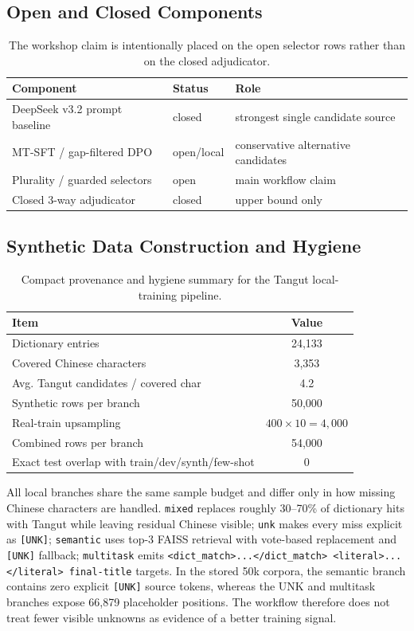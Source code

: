 \documentclass{article}
\begin{document}
\subsection{Open and Closed Components}

\begin{table}[H]
\centering
\small
\begin{tabular}{lll}
\toprule
Component & Status & Role \\
\midrule
DeepSeek v3.2 prompt baseline & closed & strongest single candidate source \\
MT-SFT / gap-filtered DPO & open/local & conservative alternative candidates \\
Plurality / guarded selectors & open & main workflow claim \\
Closed 3-way adjudicator & closed & upper bound only \\
\bottomrule
\end{tabular}
\caption{The workshop claim is intentionally placed on the open selector rows rather than on the closed adjudicator.}
\label{tab:openclosed}
\end{table}

\subsection{Synthetic Data Construction and Hygiene}

\begin{table}[H]
\centering
\small
\begin{tabular}{lc}
\toprule
Item & Value \\
\midrule
Dictionary entries & 24,133 \\
Covered Chinese characters & 3,353 \\
Avg. Tangut candidates / covered char & 4.2 \\
Synthetic rows per branch & 50,000 \\
Real-train upsampling & $400 \times 10 = 4,000$ \\
Combined rows per branch & 54,000 \\
Exact test overlap with train/dev/synth/few-shot & 0 \\
\bottomrule
\end{tabular}
\caption{Compact provenance and hygiene summary for the Tangut local-training pipeline.}
\label{tab:synthdata}
\end{table}

All local branches share the same sample budget and differ only in how missing Chinese characters are handled. \texttt{mixed} replaces roughly 30--70\% of dictionary hits with Tangut while leaving residual Chinese visible; \texttt{unk} makes every miss explicit as \texttt{[UNK]}; \texttt{semantic} uses top-3 FAISS retrieval with vote-based replacement and \texttt{[UNK]} fallback; \texttt{multitask} emits \texttt{<dict\_match>...</dict\_match> <literal>...</literal> final-title} targets. In the stored 50k corpora, the semantic branch contains zero explicit \texttt{[UNK]} source tokens, whereas the UNK and multitask branches expose 66,879 placeholder positions. The workflow therefore does not treat fewer visible unknowns as evidence of a better training signal.
\end{document}
